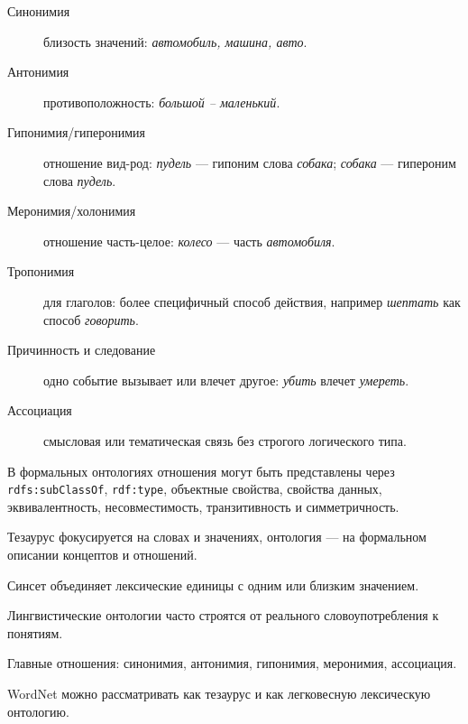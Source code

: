 \begin{description}
    \item[Синонимия] близость значений: \textit{автомобиль, машина, авто}.
    \item[Антонимия] противоположность: \textit{большой -- маленький}.
    \item[Гипонимия/гиперонимия] отношение вид-род: \textit{пудель} --- гипоним слова \textit{собака}; \textit{собака} --- гипероним слова \textit{пудель}.
    \item[Меронимия/холонимия] отношение часть-целое: \textit{колесо} --- часть \textit{автомобиля}.
    \item[Тропонимия] для глаголов: более специфичный способ действия, например \textit{шептать} как способ \textit{говорить}.
    \item[Причинность и следование] одно событие вызывает или влечет другое: \textit{убить} влечет \textit{умереть}.
    \item[Ассоциация] смысловая или тематическая связь без строгого логического типа.
\end{description}

В формальных онтологиях отношения могут быть представлены через \texttt{rdfs:subClassOf}, \texttt{rdf:type}, объектные свойства, свойства данных, эквивалентность, несовместимость, транзитивность и симметричность.

\begin{important}
    \item Тезаурус фокусируется на словах и значениях, онтология --- на формальном описании концептов и отношений.
    \item Синсет объединяет лексические единицы с одним или близким значением.
    \item Лингвистические онтологии часто строятся от реального словоупотребления к понятиям.
    \item Главные отношения: синонимия, антонимия, гипонимия, меронимия, ассоциация.
    \item WordNet можно рассматривать как тезаурус и как легковесную лексическую онтологию.
\end{important}

